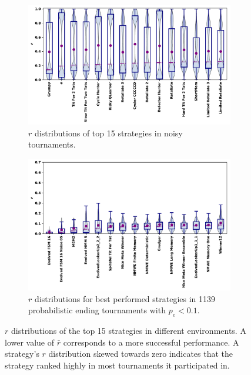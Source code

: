 \documentclass{article}
\begin{document}
\begin{figure}[!htbp]
\begin{subfigure}{0.475\textwidth}
        \centering 
        \includegraphics[width=\textwidth]{../images/performance_noise.pdf}
        \caption{$r$ distributions of top 15 strategies in noisy tournaments.}\label{fig:noise_overall_results}
    \end{subfigure}
    \quad
    \begin{subfigure}{0.475\textwidth}
        \centering
        \includegraphics[width=\textwidth]{../images/probend_performance_subset.pdf}
        \caption{\(r\) distributions for best performed strategies in 1139 probabilistic ending
        tournaments with \(p_e < 0.1\).}
        \label{fig:probend_results}
    \end{subfigure}
    \caption{\(r\) distributions of the top 15 strategies in different environments. A lower value of
    \(\bar{r}\) corresponds to a more successful performance. A strategy's \(r\) distribution skewed towards zero
    indicates that the strategy ranked highly in most tournaments it participated in.}\label{fig:r_distributions}
\end{figure}
\end{document}
